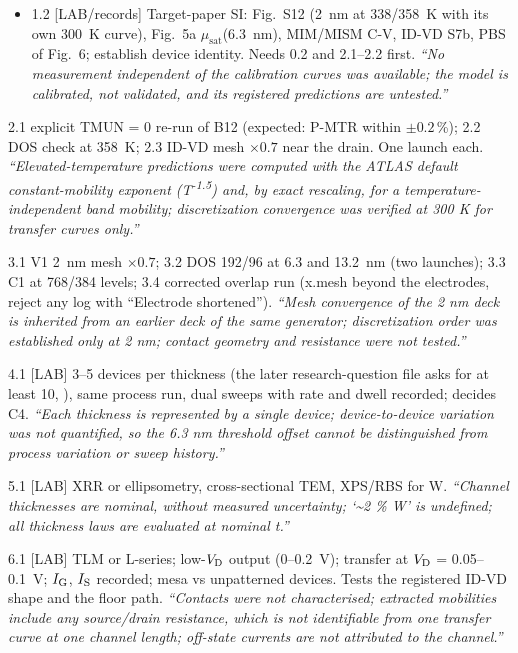 \begin{description}
\begin{itemize}
    \item 1.2 [LAB/records] Target-paper SI: Fig.~S12 (2~nm at 338/358~K with its own 300~K curve), Fig.~5a $\mu_{\mathrm{sat}}$(6.3~nm), MIM/MISM C-V, ID-VD S7b, PBS of Fig.~6; establish device identity. Needs 0.2 and 2.1--2.2 first. \emph{``No measurement independent of the calibration curves was available; the model is calibrated, not validated, and its registered predictions are untested.''}
  \end{itemize}
  \item[Tier 2 (ATLAS; before a registered prediction is compared).] 2.1 explicit TMUN = 0 re-run of B12 (expected: P-MTR within $\pm0.2$\,\%); 2.2 DOS check at 358~K; 2.3 ID-VD mesh $\times0.7$ near the drain. One launch each. \emph{``Elevated-temperature predictions were computed with the ATLAS default constant-mobility exponent (T\textsuperscript{-1.5}) and, by exact rescaling, for a temperature-independent band mobility; discretization convergence was verified at 300 K for transfer curves only.''}
  \item[Tier 3 (ATLAS numerical closure).] 3.1 V1 2~nm mesh $\times0.7$; 3.2 DOS 192/96 at 6.3 and 13.2~nm (two launches); 3.3 C1 at 768/384 levels; 3.4 corrected overlap run (x.mesh beyond the electrodes, reject any log with ``Electrode shortened''). \emph{``Mesh convergence of the 2 nm deck is inherited from an earlier deck of the same generator; discretization order was established only at 2 nm; contact geometry and resistance were not tested.''}
  \item[Tier 4 (replicates; before any film-specific claim).] 4.1 [LAB] 3--5 devices per thickness (the later research-question file asks for at least 10, ), same process run, dual sweeps with rate and dwell recorded; decides C4. \emph{``Each thickness is represented by a single device; device-to-device variation was not quantified, so the 6.3 nm threshold offset cannot be distinguished from process variation or sweep history.''}
  \item[Tier 5 (thickness metrology; before any $t$-law).] 5.1 [LAB] XRR or ellipsometry, cross-sectional TEM, XPS/RBS for W. \emph{``Channel thicknesses are nominal, without measured uncertainty; `\textasciitilde 2 \% W' is undefined; all thickness laws are evaluated at nominal t.''}
  \item[Tier 6 (contacts and parasitic paths; needs 1, 5).] 6.1 [LAB] TLM or L-series; low-$V_{\mathrm{D}}$ output (0--0.2~V); transfer at $V_{\mathrm{D}}$ = 0.05--0.1~V; $I_{\mathrm{G}}$, $I_{\mathrm{S}}$ recorded; mesa vs unpatterned devices. Tests the registered ID-VD shape and the floor path. \emph{``Contacts were not characterised; extracted mobilities include any source/drain resistance, which is not identifiable from one transfer curve at one channel length; off-state currents are not attributed to the channel.''}

\end{description}
